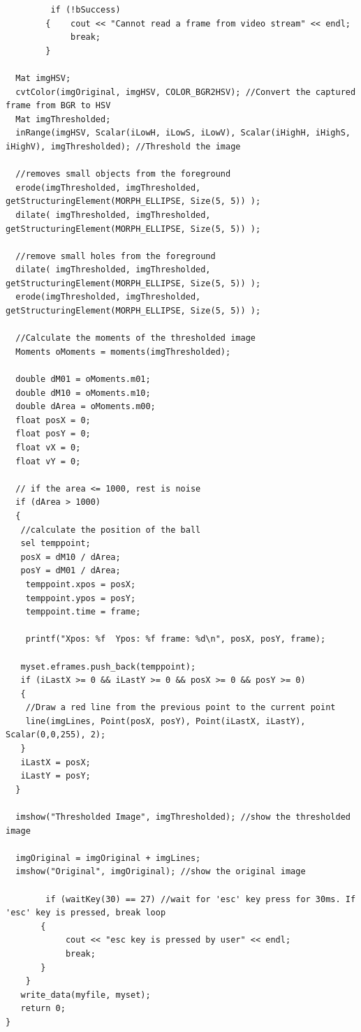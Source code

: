\documentclass[paper=a4, fontsize=11pt, abstract=on]{scrartcl}
\numberwithin{equation}{section}		%
\numberwithin{figure}{section}			%
\numberwithin{table}{section}				%
\begin{document}
\begin{lstlisting}
         if (!bSuccess) 
        {    cout << "Cannot read a frame from video stream" << endl;
             break;
        }

  Mat imgHSV;
  cvtColor(imgOriginal, imgHSV, COLOR_BGR2HSV); //Convert the captured frame from BGR to HSV 
  Mat imgThresholded;
  inRange(imgHSV, Scalar(iLowH, iLowS, iLowV), Scalar(iHighH, iHighS, iHighV), imgThresholded); //Threshold the image
      
  //removes small objects from the foreground
  erode(imgThresholded, imgThresholded, getStructuringElement(MORPH_ELLIPSE, Size(5, 5)) );
  dilate( imgThresholded, imgThresholded, getStructuringElement(MORPH_ELLIPSE, Size(5, 5)) ); 

  //remove small holes from the foreground
  dilate( imgThresholded, imgThresholded, getStructuringElement(MORPH_ELLIPSE, Size(5, 5)) ); 
  erode(imgThresholded, imgThresholded, getStructuringElement(MORPH_ELLIPSE, Size(5, 5)) );

  //Calculate the moments of the thresholded image
  Moments oMoments = moments(imgThresholded);

  double dM01 = oMoments.m01;
  double dM10 = oMoments.m10;
  double dArea = oMoments.m00;
  float posX = 0;
  float posY = 0;
  float vX = 0;
  float vY = 0;
  
  // if the area <= 1000, rest is noise
  if (dArea > 1000)
  {
   //calculate the position of the ball
   sel temppoint;   
   posX = dM10 / dArea;
   posY = dM01 / dArea;
    temppoint.xpos = posX;
    temppoint.ypos = posY;
    temppoint.time = frame;
    
    printf("Xpos: %f  Ypos: %f frame: %d\n", posX, posY, frame); 
    
   myset.eframes.push_back(temppoint);                       
   if (iLastX >= 0 && iLastY >= 0 && posX >= 0 && posY >= 0)
   {
    //Draw a red line from the previous point to the current point
    line(imgLines, Point(posX, posY), Point(iLastX, iLastY), Scalar(0,0,255), 2);
   }
   iLastX = posX;
   iLastY = posY;
  }

  imshow("Thresholded Image", imgThresholded); //show the thresholded image

  imgOriginal = imgOriginal + imgLines;
  imshow("Original", imgOriginal); //show the original image

        if (waitKey(30) == 27) //wait for 'esc' key press for 30ms. If 'esc' key is pressed, break loop
       {
            cout << "esc key is pressed by user" << endl;
            break; 
       }
    }       
   write_data(myfile, myset);
   return 0;
}



\end{lstlisting}
\end{document}
